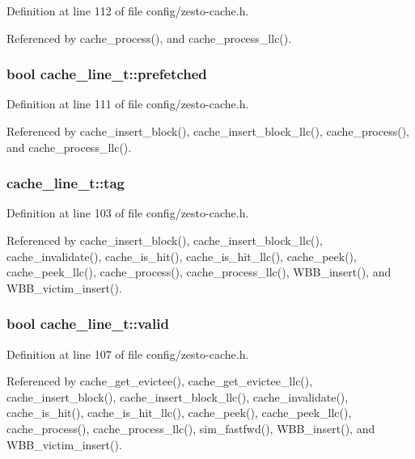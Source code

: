 Definition at line 112 of file config/zesto-cache.h.

Referenced by cache\_\-process(), and cache\_\-process\_\-llc().
\subsubsection[{prefetched}]{\setlength{\rightskip}{0pt plus 5cm}bool {\bf cache\_\-line\_\-t::prefetched}}\label{structcache__line__t_7fada63be5e35a706f126649aa7d43b1}




Definition at line 111 of file config/zesto-cache.h.

Referenced by cache\_\-insert\_\-block(), cache\_\-insert\_\-block\_\-llc(), cache\_\-process(), and cache\_\-process\_\-llc().
\subsubsection[{tag}]{ {\bf cache\_\-line\_\-t::tag}}\label{structcache__line__t_b3486b4c83039734082967ce55d37f3a}




Definition at line 103 of file config/zesto-cache.h.

Referenced by cache\_\-insert\_\-block(), cache\_\-insert\_\-block\_\-llc(), cache\_\-invalidate(), cache\_\-is\_\-hit(), cache\_\-is\_\-hit\_\-llc(), cache\_\-peek(), cache\_\-peek\_\-llc(), cache\_\-process(), cache\_\-process\_\-llc(), WBB\_\-insert(), and WBB\_\-victim\_\-insert().
\subsubsection[{valid}]{\setlength{\rightskip}{0pt plus 5cm}bool {\bf cache\_\-line\_\-t::valid}}\label{structcache__line__t_a28415835a1134b3b9c32020ad2ffdc9}




Definition at line 107 of file config/zesto-cache.h.

Referenced by cache\_\-get\_\-evictee(), cache\_\-get\_\-evictee\_\-llc(), cache\_\-insert\_\-block(), cache\_\-insert\_\-block\_\-llc(), cache\_\-invalidate(), cache\_\-is\_\-hit(), cache\_\-is\_\-hit\_\-llc(), cache\_\-peek(), cache\_\-peek\_\-llc(), cache\_\-process(), cache\_\-process\_\-llc(), sim\_\-fastfwd(), WBB\_\-insert(), and WBB\_\-victim\_\-insert().
